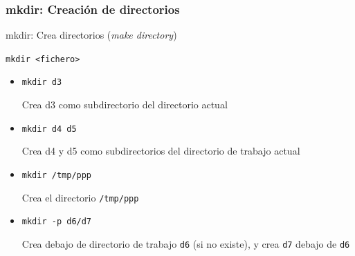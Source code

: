 \documentclass[ucs]{beamer}
\begin{document}
\begin{frame}[fragile]
\frametitle{mkdir: Creación de directorios}

   mkdir: Crea directorios (\emph{make directory})

\verb|mkdir <fichero>|
\begin{itemize}
\item
\verb|mkdir d3|  

Crea d3 como subdirectorio del directorio actual

\item
\verb|mkdir d4 d5|  

Crea d4 y d5 como subdirectorios del directorio de trabajo actual

\item
\verb|mkdir /tmp/ppp|  

Crea el directorio \verb|/tmp/ppp| 

\item
\verb|mkdir -p d6/d7|  

Crea debajo de directorio de trabajo \verb|d6| (si no existe), y crea \verb|d7| debajo de \verb|d6|

\end{itemize}



\end{frame}

\end{document}
